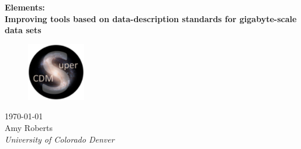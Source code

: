 \begin{titlepage}

\begin{center}
\textbf{\Huge Elements:}\\[0.3cm]
\textbf{\Huge Improving tools based on data-description standards  for gigabyte-scale data sets}\\[0.8cm]

\begin{figure}
\begin{center}
\includegraphics[height=1in]{Figures/SuperCDMS_logo.png}
\end{center}
\end{figure}

\textrm{\today}\\[1.8cm]

\textrm{\LARGE Amy Roberts}\\[0.9cm]
\textit{\Large
University of Colorado Denver} 

\end{center}


\end{titlepage}